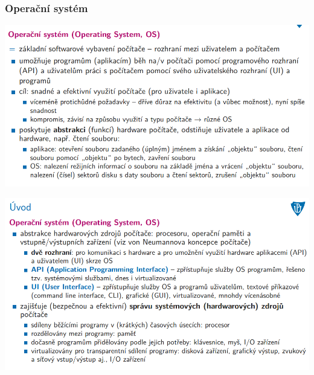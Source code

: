 \documentclass[10pt,a4paper]{article}
\begin{document}

\subsubsection{Operační systém}
\includegraphics[scale=0.65]{img/druhy_odstavec/os1.png}

\includegraphics[scale=0.65]{img/druhy_odstavec/os2.png}
\end{document}
